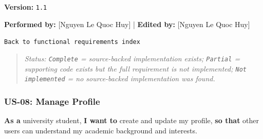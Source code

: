 \documentclass[12pt]{article}
\begin{document}
\textbf{Version:} \texttt{1.1}
\par\medskip

\textbf{Performed by:} [Nguyen Le Quoc Huy] | \textbf{Edited by:} [Nguyen Le Quoc Huy]
\par\medskip

\texttt{Back to functional requirements index}
\par\medskip

\begin{quote}
\textit{Status: \texttt{Complete} = source-backed implementation exists; \texttt{Partial} = supporting code exists but the full requirement is not implemented; \texttt{Not implemented} = no source-backed implementation was found.}
\end{quote}
\par\medskip

\hypertarget{sec:us-08-manage-profile}{}
\subsubsection*{US-08: Manage Profile}
\par\medskip

\textbf{As a} university student, \textbf{I want to} create and update my profile, \textbf{so that} other users can understand my academic background and interests.
\par\medskip
\end{document}
